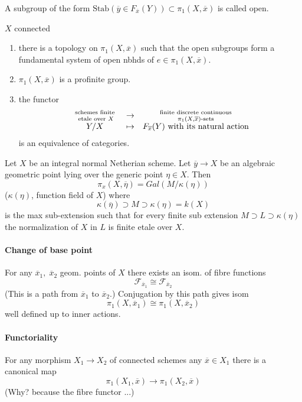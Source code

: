 \begin{definition}A subgroup of the form $\text{Stab}(\overline y\in
F_{\overline x}(Y))\subset \pi_1(X, \overline x)$ is called open.
\end{definition}

\begin{theorem} $X$ connected
\begin{enumerate}
\item there is a topology on $\pi_1(X, \overline x)$ such that the open
subgroups form a fundamental system of open nbhds of $e\in \pi_1(X, \overline
x)$.
\item $\pi_1(X, \overline x)$ is a profinite group.
\item the functor
$$
\begin{matrix}
\text{ schemes finite }\atop \text{ etale over }X & \to &
\text{ finite discrete continuous }\atop \pi_1(X, \overline x)\text{-sets}\\
Y / X& \mapsto & F_{\overline x}(Y) \text{ with its natural action}
\end{matrix}
$$
is an equivalence of categories.
\end{enumerate}
\end{theorem}

\begin{proposition} Let $X$ be an integral normal Netherian scheme. Let
$\overline y\to X$ be an algebraic geometric point lying over the generic point
$\eta\in X$. Then
$$\pi_x(X, \overline \eta) = Gal(M/\kappa(\eta))$$
($\kappa(\eta)$, function field of $X$) where
$$\kappa(\overline \eta)\supset M\supset \kappa(\eta) = k(X)$$
is the max sub-extension such that for every finite sub extension
$M\supset L\supset \kappa(\eta)$ the normalization of $X$ in $L$ is finite
etale over $X$.
\end{proposition}

\paragraph{Change of base point} For any $\overline x_1, \; \overline x_2$
geom. points of $X$ there exists an isom. of fibre functions
$$\mathcal{F}_{\overline x_1} \cong \mathcal{F}_{\overline x_2}$$
(This is a path from $\overline x_1$ to $\overline x_2$.) Conjugation
by this path gives isom
$$\pi_1(X, \overline x_1) \cong \pi_1(X, \overline x_2)$$
well defined up to inner actions.

\paragraph{Functoriality} For any morphism $X_1\to X_2$ of connected schemes
any $\overline x\in X_1$ there is a canonical map
$$\pi_1(X_1, \overline x) \to \pi_1(X_2, \overline x)$$
(Why? because the fibre functor ...)

